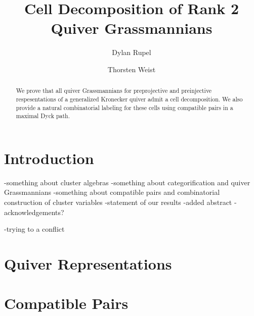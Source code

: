 \documentclass{amsart}
\author{Dylan Rupel}
\author{Thorsten Weist}
\title{Cell Decomposition of Rank 2 Quiver Grassmannians}
\begin{document}
\begin{abstract}
  We prove that all quiver Grassmannians for preprojective and preinjective respesentations of a generalized Kronecker quiver admit a cell decomposition.  
  We also provide a natural combinatorial labeling for these cells using compatible pairs in a maximal Dyck path. 
\end{abstract}
\maketitle

\section{Introduction}
-something about cluster algebras
-something about categorification and quiver Grassmannians
-something about compatible pairs and combinatorial construction of cluster variables
-statement of our results
-added abstract
-acknowledgements?

-trying to  a conflict

\section{Quiver Representations}

\section{Compatible Pairs}
\end{document}
